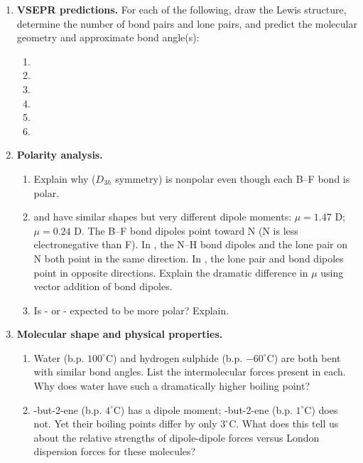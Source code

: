 \documentclass[12pt, a4paper]{book}
\begin{document}
\begin{problembox}
\begin{enumerate}[label=\textbf{\arabic*.}]
  \item \textbf{VSEPR predictions.}
    For each of the following, draw the Lewis structure,
    determine the number of bond pairs and lone pairs,
    and predict the molecular geometry and approximate bond angle(s):
    \begin{enumerate}[label=(\alph*)]
      \item {}
      \item {}
      \item {}
      \item {}
      \item {}
      \item {}
    \end{enumerate}

  \item \textbf{Polarity analysis.}
    \begin{enumerate}[label=(\alph*)]
      \item Explain why  ($D_{3h}$ symmetry) is
            nonpolar even though each B--F bond is polar.
      \item {} and  have similar shapes but
            very different dipole moments:
             $\mu = 1.47$ D;  $\mu = 0.24$ D.
            The B--F bond dipoles point toward N (N is less
            electronegative than F).
            In , the N--H bond dipoles and the lone
            pair on N both point in the same direction.
            In , the lone pair and bond dipoles point
            in opposite directions.
            Explain the dramatic difference in $\mu$ using
            vector addition of bond dipoles.
      \item Is - or -
            expected to be more polar? Explain.
    \end{enumerate}

  \item \textbf{Molecular shape and physical properties.}
    \begin{enumerate}[label=(\alph*)]
      \item Water (b.p. $100^\circ$C) and hydrogen sulphide
            (b.p. $-60^\circ$C) are both bent with similar
            bond angles.
            List the intermolecular forces present in each.
            Why does water have such a dramatically higher
            boiling point?
      \item {}-but-2-ene (b.p. $4^\circ$C) has a dipole
            moment; -but-2-ene (b.p. $1^\circ$C)
            does not.
            Yet their boiling points differ by only $3^\circ$C.
            What does this tell us about the relative strengths
            of dipole-dipole forces versus London dispersion
            forces for these molecules?
    \end{enumerate}
\end{enumerate}
\end{problembox}
\end{document}
